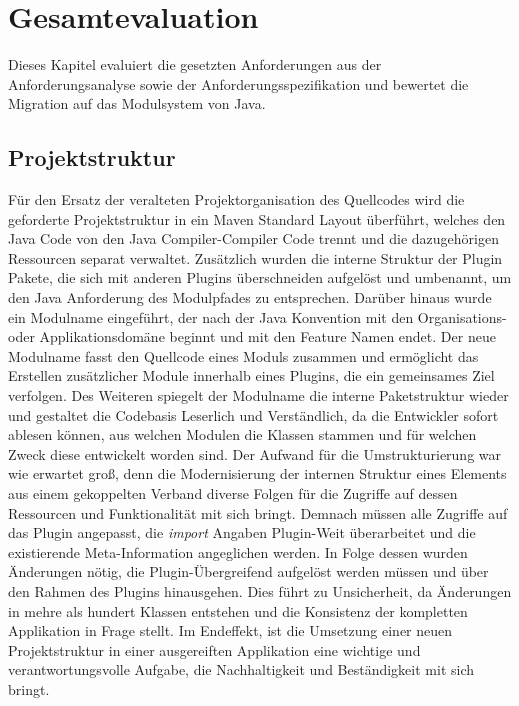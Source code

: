 \chapter{Gesamtevaluation}
Dieses Kapitel evaluiert die gesetzten Anforderungen aus der Anforderungsanalyse sowie der Anforderungsspezifikation und bewertet die Migration auf das Modulsystem von Java.\bigbreak	

\section{Projektstruktur}
Für den Ersatz der veralteten Projektorganisation des Quellcodes wird die geforderte Projektstruktur in ein Maven Standard Layout überführt, welches den Java Code von den Java Compiler-Compiler Code trennt und die dazugehörigen Ressourcen separat verwaltet. Zusätzlich wurden die interne Struktur der Plugin Pakete, die sich mit anderen Plugins überschneiden aufgelöst und umbenannt, um den Java Anforderung des Modulpfades zu entsprechen. Darüber hinaus wurde ein Modulname eingeführt, der nach der Java Konvention mit den Organisations- oder Applikationsdomäne beginnt und mit den Feature Namen endet. Der neue Modulname fasst den Quellcode eines Moduls zusammen und ermöglicht das Erstellen zusätzlicher Module innerhalb eines Plugins, die ein gemeinsames Ziel verfolgen. Des Weiteren spiegelt der Modulname die interne Paketstruktur wieder und gestaltet die Codebasis Leserlich und Verständlich, da die Entwickler sofort ablesen können, aus welchen Modulen die Klassen stammen und für welchen Zweck diese entwickelt worden sind.\newline
Der Aufwand für die Umstrukturierung war wie erwartet groß, denn die Modernisierung der internen Struktur eines Elements aus einem gekoppelten Verband diverse Folgen für die Zugriffe auf dessen Ressourcen und Funktionalität mit sich bringt. Demnach müssen alle Zugriffe auf das Plugin angepasst, die \textit{import} Angaben Plugin-Weit überarbeitet und die existierende Meta-Information angeglichen werden. In Folge dessen wurden Änderungen nötig, die Plugin-Übergreifend aufgelöst werden müssen und über den Rahmen des Plugins hinausgehen. Dies führt zu Unsicherheit, da Änderungen in mehre als hundert Klassen entstehen und die Konsistenz der kompletten Applikation in Frage stellt. \newline
Im Endeffekt, ist die Umsetzung einer neuen Projektstruktur in einer ausgereiften Applikation eine wichtige und verantwortungsvolle Aufgabe, die  Nachhaltigkeit und Beständigkeit mit sich bringt.\bigbreak

